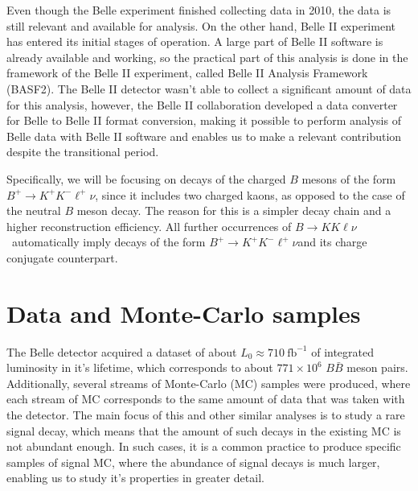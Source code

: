 \documentclass[headings=standardclasses,headings=big,oneside,a4paper,openany,12pt]{scrbook}
\newcommand {\e}[1]{\mathrm{~#1}}
\newcommand {\E}[1]{\times 10^{#1}}
\newcommand {\decaya}{$B \rightarrow K K \ell \nu$}
\newcommand {\decayb}{$B^+ \rightarrow K^+ K^- \ell^+ \nu$}
\begin{document}
Even though the Belle experiment finished collecting data in 2010, the data is still relevant and available for analysis. On the other hand, Belle II experiment has entered its initial stages of operation. A large part of Belle II software is already available and working, so the practical part of this analysis is done in the framework of the Belle II experiment, called Belle II Analysis Framework (BASF2). The Belle II detector wasn't able to collect a significant amount of data for this analysis, however, the Belle II collaboration developed a data converter for Belle to Belle II format conversion, making it possible to perform analysis of Belle data with Belle II software and enables us to make a relevant contribution despite the transitional period.

Specifically, we will be focusing on decays of the charged $B$ mesons of the form \decayb, since it includes two charged kaons, as opposed to the case of the neutral $B$ meson decay. The reason for this is a simpler decay chain and a higher reconstruction efficiency. All further occurrences of \decaya~automatically imply decays of the form \decayb and its charge conjugate counterpart.

\chapter{Data and Monte-Carlo samples}\label{sec:data-and-monte-carlo-samples}

The Belle detector acquired a dataset of about $L_0 \approx 710\e{fb^{-1}}$ of integrated luminosity in it's lifetime, which corresponds to about $771\E{6}$ $B \bar B$ meson pairs. Additionally, several streams of Monte-Carlo (MC) samples were produced, where each stream of MC corresponds to the same amount of data that was taken with the detector. The main focus of this and other similar analyses is to study a rare signal decay, which means that the amount of such decays in the existing MC is not abundant enough. In such cases, it is a common practice to produce specific samples of signal MC, where the abundance of signal decays is much larger, enabling us to study it's properties in greater detail.
\end{document}
